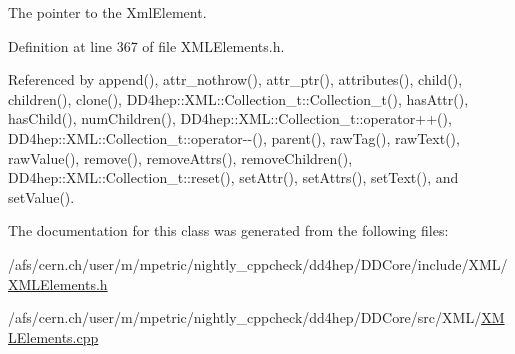 The pointer to the XmlElement. 

Definition at line 367 of file XMLElements.h.

Referenced by append(), attr\_\-nothrow(), attr\_\-ptr(), attributes(), child(), children(), clone(), DD4hep::XML::Collection\_\-t::Collection\_\-t(), hasAttr(), hasChild(), numChildren(), DD4hep::XML::Collection\_\-t::operator++(), DD4hep::XML::Collection\_\-t::operator-\/-\/(), parent(), rawTag(), rawText(), rawValue(), remove(), removeAttrs(), removeChildren(), DD4hep::XML::Collection\_\-t::reset(), setAttr(), setAttrs(), setText(), and setValue().

The documentation for this class was generated from the following files:\begin{DoxyCompactItemize}
\item 
/afs/cern.ch/user/m/mpetric/nightly\_\-cppcheck/dd4hep/DDCore/include/XML/\hyperlink{_x_m_l_elements_8h}{XMLElements.h}\item 
/afs/cern.ch/user/m/mpetric/nightly\_\-cppcheck/dd4hep/DDCore/src/XML/\hyperlink{_x_m_l_elements_8cpp}{XMLElements.cpp}\end{DoxyCompactItemize}
